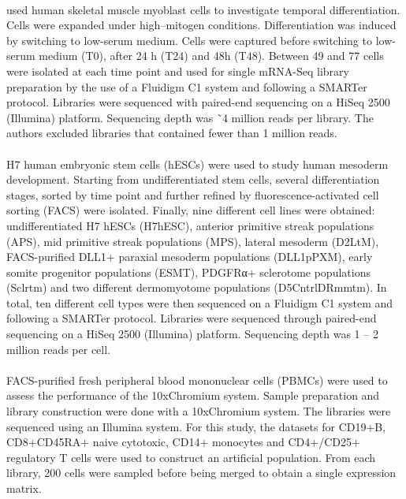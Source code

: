 \documentclass[11pt, a4paper]{article}\usepackage[]{graphicx}\usepackage[]{color}
\begin{document}
\paragraph{\citet{trapnell2014dynamics}} 
\citet{trapnell2014dynamics} used human skeletal muscle myoblast cells to investigate temporal differentiation. Cells were expanded under high--mitogen conditions. Differentiation was induced by switching to low-serum medium. Cells were captured before switching to low-serum medium (T0), after 24 h (T24) and 48h (T48). Between 49 and 77 cells were isolated at each time point and used for single mRNA-Seq library preparation by the use of a Fluidigm C1 system and following a SMARTer protocol. Libraries were sequenced with paired-end sequencing on a HiSeq 2500 (Illumina) platform. Sequencing depth was ˜4 million reads per library. The authors excluded libraries that contained fewer than 1 million reads. 
\paragraph{\citet{koh2016atlas} }
H7 human embryonic stem cells (hESCs) were used to study human mesoderm development. Starting from undifferentiated stem cells, several differentiation stages, sorted by time point and further refined by fluorescence-activated cell sorting (FACS) were isolated. Finally, nine different cell lines were obtained:  undifferentiated H7 hESCs (H7hESC), anterior primitive streak populations (APS), mid primitive streak populations (MPS), lateral mesoderm (D2LtM), FACS-purified DLL1+ paraxial mesoderm populations (DLL1pPXM), early somite progenitor populations (ESMT), PDGFRα+ sclerotome populations (Sclrtm) and two different dermomyotome populations (D5CntrlDRmmtm).
In total, ten different cell types were then sequenced on a Fluidigm C1 system and following a SMARTer protocol. Libraries were sequenced through paired-end sequencing on a HiSeq 2500 (Illumina) platform. Sequencing depth was 1 -- 2 million reads per cell. 
\paragraph{ \citet{zheng2017massively}}
FACS-purified fresh peripheral blood mononuclear cells (PBMCs) were used to assess the performance of the 10xChromium system. Sample preparation and library construction were done with a 10xChromium system. The libraries were sequenced using an Illumina system. For this study, the datasets for CD19+B, CD8+CD45RA+ naive cytotoxic, CD14+ monocytes and CD4+/CD25+ regulatory T cells were used to construct an artificial population. From each library, 200 cells were sampled before being merged to obtain a single expression matrix.
\end{document}

